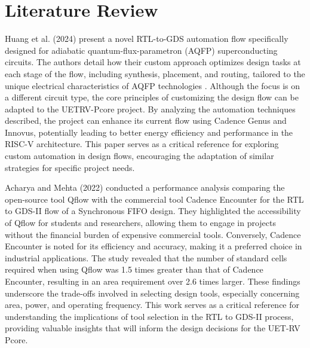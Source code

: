 
\chapter{Literature Review}
\label{Chapter3}

Huang et al. (2024) present a novel RTL-to-GDS automation flow specifically designed for adiabatic quantum-flux-parametron (AQFP) superconducting circuits. The authors detail how their custom approach optimizes design tasks at each stage of the flow, including synthesis, placement, and routing, tailored to the unique electrical characteristics of AQFP technologies \cite{huang2024superflow}. Although the focus is on a different circuit type, the core principles of customizing the design flow can be adapted to the UETRV-Pcore project. By analyzing the automation techniques described, the project can enhance its current flow using Cadence Genus and Innovus, potentially leading to better energy efficiency and performance in the RISC-V architecture. This paper serves as a critical reference for exploring custom automation in design flows, encouraging the adaptation of similar strategies for specific project needs.

Acharya and Mehta (2022) conducted a performance analysis comparing the open-source tool Qflow with the commercial tool Cadence Encounter for the RTL to GDS-II flow of a Synchronous FIFO design. They highlighted the accessibility of Qflow for students and researchers, allowing them to engage in projects without the financial burden of expensive commercial tools. Conversely, Cadence Encounter is noted for its efficiency and accuracy, making it a preferred choice in industrial applications. The study revealed that the number of standard cells required when using Qflow was 1.5 times greater than that of Cadence Encounter, resulting in an area requirement over 2.6 times larger. These findings underscore the trade-offs involved in selecting design tools, especially concerning area, power, and operating frequency. This work serves as a critical reference for understanding the implications of tool selection in the RTL to GDS-II process, providing valuable insights that will inform the design decisions for the UET-RV Pcore. \cite{acharya2022performance}

